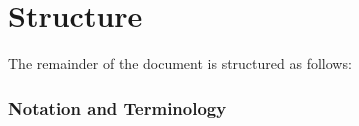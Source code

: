 \section{Structure}

The remainder of the document is structured as follows:
\fixme{\ldots}

\subsubsection{Notation and Terminology}

